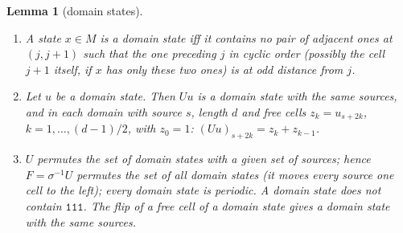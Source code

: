 \documentclass[10pt,a4paper]{article}
\newtheorem{lemma}[theorem]{Lemma}
\newcommand{\code}[1]{\mathtt{#1}}            %
\begin{document}
\begin{lemma}[domain states]\label{26:lem:domain}
\begin{enumerate}[label=\textup{(\alph*)},nosep,leftmargin=*]
\item A state $x\in M$ is a domain state iff it contains no pair of adjacent ones at $(j,j+1)$ such that the one
preceding $j$ in cyclic order (possibly the cell $j+1$ itself, if $x$ has only these two ones) is at odd distance
from $j$.
\item Let $u$ be a domain state. Then $Uu$ is a domain state with the same sources, and in each domain with source
$s$, length $d$ and free cells $z_k=u_{s+2k}$, $k=1,\dots,(d-1)/2$, with $z_0=1$: $(Uu)_{s+2k}=z_k+z_{k-1}$.
\item $U$ permutes the set of domain states with a given set of sources; hence $F=\sigma^{-1}U$ permutes the set of
all domain states (it moves every source one cell to the left); every domain state is periodic. A domain state does
not contain $\code{111}$. The flip of a free cell of a domain state gives a domain state with the same sources.
\end{enumerate}
\end{lemma}
\end{document}
